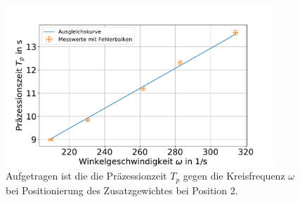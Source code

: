 \begin{figure}[h]
	\centering
	\includegraphics[width=0.9\textwidth]{res/sproHzmitte.pdf}
	\caption{Aufgetragen ist die die Präzessionzeit $T_p$ gegen die Kreisfrequenz $\omega$ bei Positionierung des Zusatzgewichtes bei Position 2.}
	\label{fig:Kreiselmitte}
\end{figure}


